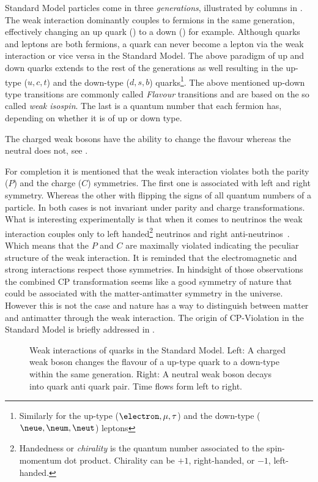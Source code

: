 Standard Model particles come in three {\it generations}, illustrated by columns in .
The weak interaction dominantly couples to fermions in the same generation, effectively changing an up quark (\uquark) to a down (\dquark) for example.
Although quarks and leptons are both fermions, a quark can never become a lepton via the weak interaction or vice versa in the Standard Model.
The above paradigm of up and down quarks extends to the rest of the generations as well resulting in the up-type ($u,c,t$) and the down-type ($d,s,b$)
quarks\footnote{Similarly for the  up-type ($\electron,\mu,\tau$) and the down-type ($\neue,\neum,\neut$) leptons}. The above mentioned up-down type
transitions are commonly called {\it Flavour} transitions and are based on the so called {\it weak isospin}. The last is a quantum number
that each fermion has, depending on whether it is of up or down type. 

The charged weak bosons \Wpm have the ability to change the flavour whereas the neutral \Z  does not, see .

For completion it is mentioned that the weak interaction violates both the parity ($P$) and the charge ($C$) symmetries.
The first one is associated with left and right symmetry. Whereas the other with flipping the signs of all quantum numbers of a particle.
In both cases  is not invariant under parity and charge transformations. What is interesting experimentally
is that when it comes to neutrinos the weak interaction couples only to left handed\footnote{Handedness or {\it chirality} is the quantum number associated to the spin-momentum dot product.
Chirality can be $+1$, right-handed,  or $-1$, left-handed. } neutrinos and right anti-neutrinos~\cite{wu-parity,garwin-parity}.
Which means that the $P$ and $C$ are maximally violated indicating the peculiar structure of the weak interaction. It is reminded that
the electromagnetic and strong interactions respect those symmetries. In hindsight of those observations the combined CP transformation
seems like a good symmetry of nature that could be associated with the matter-antimatter symmetry in the universe.
However this is not the case and nature has a way to distinguish between matter and antimatter through the weak interaction.
The origin of CP-Violation in the Standard Model is briefly addressed in .


\begin{figure}[h]
  \centering
  {\sffamily }
  \caption{Weak interactions of quarks in the Standard Model. Left: A charged weak boson changes the flavour of a up-type quark to a down-type within the same generation.
           Right: A neutral weak boson decays into quark anti quark pair. Time flows form left to right.}
  \label{WeakInteractions}
\end{figure}

